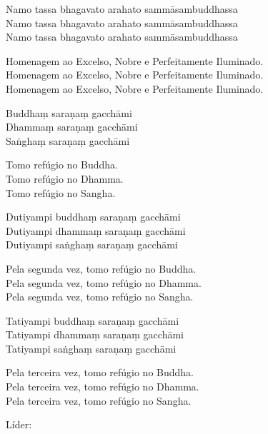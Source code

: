 Namo tassa bhagavato arahato sammāsambuddhassa\\
Namo tassa bhagavato arahato sammāsambuddhassa\\
Namo tassa bhagavato arahato sammāsambuddhassa

\begin{english}
  Homenagem ao Excelso, Nobre e Perfeitamente Iluminado.\\
  Homenagem ao Excelso, Nobre e Perfeitamente Iluminado.\\
  Homenagem ao Excelso, Nobre e Perfeitamente Iluminado.
\end{english}

Buddhaṃ saraṇaṃ gacchāmi\\
Dhammaṃ saraṇaṃ gacchāmi\\
Saṅghaṃ saraṇaṃ gacchāmi

\begin{english}
  Tomo refúgio no Buddha.\\
  Tomo refúgio no Dhamma.\\
  Tomo refúgio no Sangha.
\end{english}

Dutiyampi buddhaṃ saraṇaṃ gacchāmi\\
Dutiyampi dhammaṃ saraṇaṃ gacchāmi\\
Dutiyampi saṅghaṃ saraṇaṃ gacchāmi

\begin{english}
  Pela segunda vez, tomo refúgio no Buddha.\\
  Pela segunda vez, tomo refúgio no Dhamma.\\
  Pela segunda vez, tomo refúgio no Sangha.
\end{english}

Tatiyampi buddhaṃ saraṇaṃ gacchāmi\\
Tatiyampi dhammaṃ saraṇaṃ gacchāmi\\
Tatiyampi saṅghaṃ saraṇaṃ gacchāmi

\clearpage

\begin{english}
  Pela terceira vez, tomo refúgio no Buddha.\\
  Pela terceira vez, tomo refúgio no Dhamma.\\
  Pela terceira vez, tomo refúgio no Sangha.
\end{english}

\begin{instruction}
  Líder:
\end{instruction}

